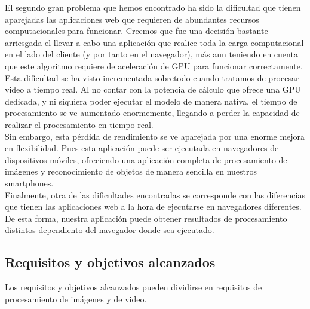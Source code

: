 \documentclass[a4paper]{article}
\begin{document}
El segundo gran problema que hemos encontrado ha sido la dificultad que tienen aparejadas las 
aplicaciones web que requieren de abundantes recursos computacionales para funcionar. Creemos que fue 
una decisión bastante arriesgada el llevar a cabo una aplicación que realice toda la carga 
computacional en el lado del cliente (y por tanto en el navegador), más aun teniendo en cuenta que 
este algoritmo requiere de aceleración de GPU para funcionar correctamente. \\

Esta dificultad se ha visto incrementada sobretodo cuando tratamos de procesar video a tiempo real. Al
no contar con la potencia de cálculo que ofrece una GPU dedicada, y ni siquiera poder ejecutar el 
modelo de manera nativa, el tiempo de procesamiento se ve aumentado enormemente, llegando a perder la 
capacidad de realizar el procesamiento en tiempo real.\\

Sin embargo, esta pérdida de rendimiento se ve aparejada por una enorme mejora en flexibilidad. Pues 
esta aplicación puede ser ejecutada en navegadores de dispositivos móviles, ofreciendo una aplicación 
completa de procesamiento de imágenes y reconocimiento de objetos de manera sencilla en nuestros smartphones.\\

Finalmente, otra de las dificultades encontradas se corresponde con las diferencias que tienen las 
aplicaciones web a la hora de ejecutarse en navegadores diferentes. De esta forma, nuestra aplicación 
puede obtener resultados de procesamiento distintos dependiento del navegador donde sea ejecutado.

\subsection{Requisitos y objetivos alcanzados}
Los requisitos y objetivos alcanzados pueden dividirse en requisitos de procesamiento de imágenes y de video.
\end{document}

